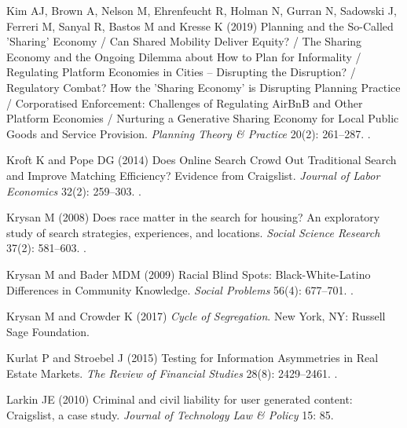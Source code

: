 \documentclass[11pt,letterpaper]{article}
\begin{document}
\begin{thebibliography}{77}
	Kim AJ, Brown A, Nelson M, Ehrenfeucht R, Holman N, Gurran N, Sadowski J,
	Ferreri M, Sanyal R, Bastos M and Kresse K (2019) Planning and the
	{So}-{Called} '{Sharing}' {Economy} / {Can} {Shared} {Mobility} {Deliver}
	{Equity}? / {The} {Sharing} {Economy} and the {Ongoing} {Dilemma} about {How}
	to {Plan} for {Informality} / {Regulating} {Platform} {Economies} in {Cities}
	– {Disrupting} the {Disruption}? / {Regulatory} {Combat}? {How} the
	'{Sharing} {Economy}' is {Disrupting} {Planning} {Practice} / {Corporatised}
	{Enforcement}: {Challenges} of {Regulating} {AirBnB} and {Other} {Platform}
	{Economies} / {Nurturing} a {Generative} {Sharing} {Economy} for {Local}
	{Public} {Goods} and {Service} {Provision}.
	\newblock \emph{Planning Theory \& Practice} 20(2): 261--287.
	\newblock {}.
	
	Kroft K and Pope DG (2014) Does {Online} {Search} {Crowd} {Out} {Traditional}
	{Search} and {Improve} {Matching} {Efficiency}? {Evidence} from {Craigslist}.
	\newblock \emph{Journal of Labor Economics} 32(2): 259--303.
	\newblock {}.
	
	Krysan M (2008) Does race matter in the search for housing? {An} exploratory
	study of search strategies, experiences, and locations.
	\newblock \emph{Social Science Research} 37(2): 581--603.
	\newblock {}.
	
	Krysan M and Bader MDM (2009) Racial {Blind} {Spots}: {Black}-{White}-{Latino}
	{Differences} in {Community} {Knowledge}.
	\newblock \emph{Social Problems} 56(4): 677--701.
	\newblock {}.
	
	Krysan M and Crowder K (2017) \emph{Cycle of {Segregation}}.
	\newblock New York, NY: Russell Sage Foundation.
	
	Kurlat P and Stroebel J (2015) Testing for {Information} {Asymmetries} in
	{Real} {Estate} {Markets}.
	\newblock \emph{The Review of Financial Studies} 28(8): 2429--2461.
	\newblock {}.
	
	Larkin JE (2010) Criminal and civil liability for user generated content:
	{Craigslist}, a case study.
	\newblock \emph{Journal of Technology Law \& Policy} 15: 85.
	

\end{thebibliography}
\end{document}
